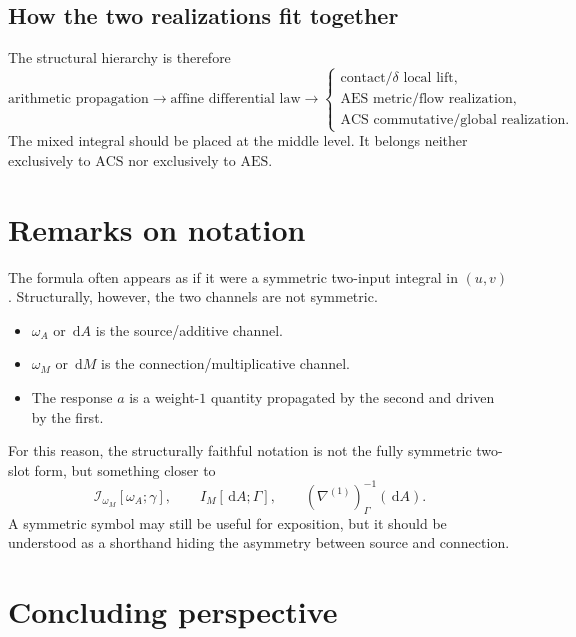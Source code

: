 \documentclass[11pt]{article}
\newcommand{\dd}{\,\mathrm{d}}
\newcommand{\ACS}{\mathrm{ACS}}
\newcommand{\AES}{\mathrm{AES}}
\newcommand{\Ipath}{\mathcal{I}}
\newcommand{\nab}{\nabla}
\begin{document}
\subsection{How the two realizations fit together}

The structural hierarchy is therefore
\[
\text{arithmetic propagation}
\longrightarrow
\text{affine differential law}
\longrightarrow
\begin{cases}
\text{contact/$\delta$ local lift},\\
\text{$\AES$ metric/flow realization},\\
\text{$\ACS$ commutative/global realization}.
\end{cases}
\]
The mixed integral should be placed at the middle level. It belongs neither exclusively to $\ACS$ nor exclusively to $\AES$.

\section{Remarks on notation}

The formula often appears as if it were a symmetric two-input integral in $(u,v)$. Structurally, however, the two channels are not symmetric.
\begin{itemize}[leftmargin=1.5em]
\item $\omega_A$ or $\dd A$ is the source/additive channel.
\item $\omega_M$ or $\dd M$ is the connection/multiplicative channel.
\item The response $a$ is a weight-$1$ quantity propagated by the second and driven by the first.
\end{itemize}

For this reason, the structurally faithful notation is not the fully symmetric two-slot form, but something closer to
\[
\Ipath_{\omega_M}[\omega_A;\gamma],
\qquad
I_M[\dd A;\Gamma],
\qquad
(\nab^{(1)})^{-1}_\Gamma(\dd A).
\]
A symmetric symbol may still be useful for exposition, but it should be understood as a shorthand hiding the asymmetry between source and connection.

\section{Concluding perspective}
\end{document}
